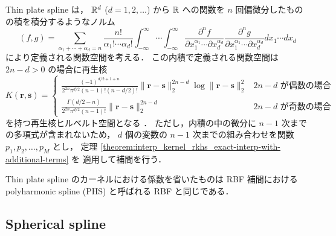 Thin plate spline \cite{Ghosh2010} は，
$\mathbb{R}^d$ ($d = 1, 2, \ldots$) から $\mathbb{R}$ への関数を
$n$ 回偏微分したものの積を積分するようなノルム
\begin{equation}
    (f, g) =
    \sum_{\alpha_1 + \cdots + \alpha_d = n} \frac{n!}{\alpha_1! \cdots \alpha_d!}
    \int_{-\infty}^{\infty} \cdots \int_{-\infty}^{\infty}
    \frac{\partial^n f}{\partial x_1^{\alpha_1} \cdots \partial x_d^{\alpha_d}}
    \frac{\partial^n g}{\partial x_1^{\alpha_1} \cdots \partial x_d^{\alpha_d}}
    dx_1 \cdots dx_d
    \label{eq:interp_kernel_thin-plate-spline_inner-product}
\end{equation}
により定義される関数空間を考える．
この内積で定義される関数空間は
$2n -d > 0$ の場合に再生核
\begin{equation}
    K(\bm{r}, \bm{s}) =
    \begin{cases}
        \displaystyle
        \frac{(-1)^{d/2 + 1 + n}}{2^{2n} \pi^{d/2} (n-1)! (n-d/2)!}
        \|\bm{r} - \bm{s}\|_2^{2n-d} \log{\|\bm{r} - \bm{s}\|_2^2}
         &
        \text{$2n-d$ が偶数の場合}
        \\[1.5em]
        \displaystyle
        \frac{\Gamma(d/2 - n)}{2^{2n} \pi^{d/2} (n-1)!}
        \|\bm{r} - \bm{s}\|_2^{2n-d}
         &
        \text{$2n-d$ が奇数の場合}
    \end{cases}
\end{equation}
を持つ再生核ヒルベルト空間となる
\cite{Ghosh2010}．
ただし，内積の中の微分に $n - 1$ 次までの多項式が含まれないため，
$d$ 個の変数の $n - 1$ 次までの組み合わせを関数 $p_1, p_2, \ldots, p_M$ とし，
定理 \ref{theorem:interp_kernel_rkhs_exact-interp-with-additional-terms} を
適用して補間を行う．

Thin plate spline のカーネルにおける係数を省いたものは
RBF 補間における polyharmonic spline (PHS) と呼ばれる RBF と同じである．

\subsection{Spherical spline}

